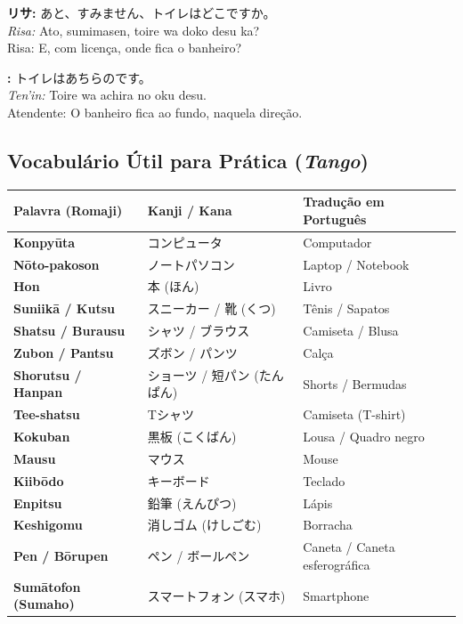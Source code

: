 \documentclass[12pt,a4paper]{article}
\begin{document}
\vspace{0.5em}

\textbf{リサ:} あと、すみません、トイレはどこですか。\\
\textit{Risa:} Ato, sumimasen, toire wa doko desu ka?\\
Risa: E, com licença, onde fica o banheiro?

\vspace{0.5em}

\textbf{:} トイレはあちらのです。\\
\textit{Ten'in:} Toire wa achira no oku desu.\\
Atendente: O banheiro fica ao fundo, naquela direção.

\newpage

\subsection*{Vocabulário Útil para Prática (\textit{Tango})}

\vspace{0.2cm}

\noindent
\small
\begin{tabularx}{\textwidth}{>{\bfseries\color{jpnavy}}l X X}
\toprule
Palavra (Romaji) & Kanji / Kana & Tradução em Português \\
\midrule
Konpyūta & コンピュータ & Computador \\
Nōto-pakoson & ノートパソコン & Laptop / Notebook \\
Hon & 本 (ほん) & Livro \\
Suniikā / Kutsu & スニーカー / 靴 (くつ) & Tênis / Sapatos \\
Shatsu / Burausu & シャツ / ブラウス & Camiseta / Blusa \\
Zubon / Pantsu & ズボン / パンツ & Calça \\
Shorutsu / Hanpan & ショーツ / 短パン (たんぱん) & Shorts / Bermudas \\
Tee-shatsu & Tシャツ & Camiseta (T-shirt) \\
Kokuban & 黒板 (こくばん) & Lousa / Quadro negro \\
Mausu & マウス & Mouse \\
Kiibōdo & キーボード & Teclado \\
Enpitsu & 鉛筆 (えんぴつ) & Lápis \\
Keshigomu & 消しゴム (けしごむ) & Borracha \\
Pen / Bōrupen & ペン / ボールペン & Caneta / Caneta esferográfica \\
Sumātofon (Sumaho) & スマートフォン (スマホ) & Smartphone \\
\bottomrule
\end{tabularx}
\end{document}
